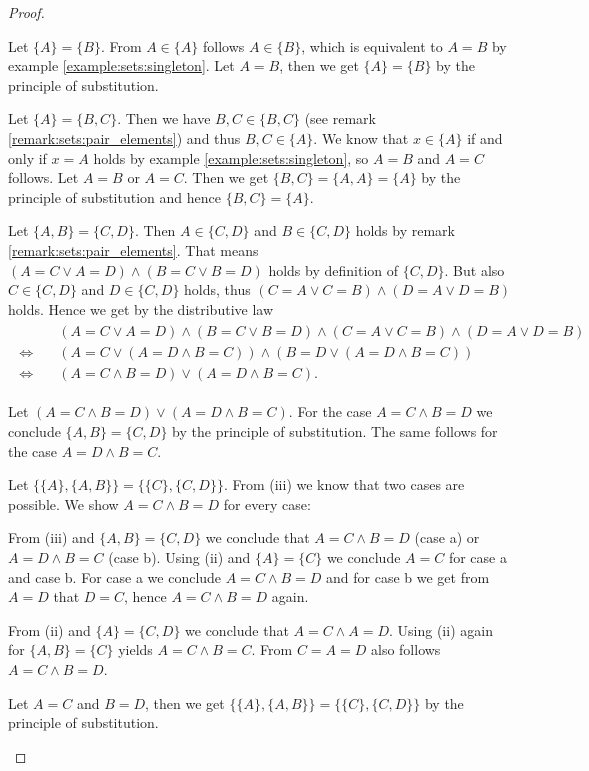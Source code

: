 \begin{proof}
    \begin{proofenumerate}
        \item{} \proofright Let $\{A\}=\{B\}$. From $A\in\{A\}$ follows $A\in\{B\}$, which is equivalent to $A=B$ by example \ref{example:sets:singleton}. \proofleft Let $A=B$, then we get $\{A\}=\{B\}$ by the principle of substitution.
        \item \proofright Let $\{A\}=\{B,C\}$. Then we have $B,C\in\{B,C\}$ (see remark \ref{remark:sets:pair_elements}) and thus $B,C\in\{A\}$. We know that $x\in\{A\}$ if and only if $x=A$ holds by example \ref{example:sets:singleton}, so $A=B$ and $A=C$ follows.
        \proofleft Let $A=B$ or $A=C$. Then we get $\{B,C\}=\{A,A\}=\{A\}$ by the principle of substitution and hence $\{B,C\}=\{A\}$.
        \item \proofright Let $\{A,B\}=\{C,D\}$. Then $A\in\{C,D\}$ and $B\in\{C,D\}$ holds by remark \ref{remark:sets:pair_elements}. That means $(A=C\lor A=D)\land (B=C \lor B=D)$ holds by definition of $\{C,D\}$. But also $C\in\{C,D\}$ and $D\in\{C,D\}$ holds, thus $(C=A\lor C=B)\land(D=A\lor D=B)$ holds. Hence we get by the distributive law
        \begin{align*}\begin{split}&(A=C\lor A=D)\land (B=C\lor B=D)\land (C=A\lor C=B)\land (D=A\lor D=B)\\
        \Leftrightarrow\quad&(A=C\lor(A=D\land B=C))\land (B=D\lor(A=D\land B=C))\\
        \Leftrightarrow\quad& (A=C\land B=D)\lor(A=D\land B=C).\end{split}\end{align*}

        \proofleft Let $(A=C\land B=D)\lor(A=D\land B=C)$. For the case $A=C\land B=D$ we conclude $\{A,B\}=\{C,D\}$ by the principle of substitution. The same follows for the case $A=D\land B=C$.

        \item \proofright Let $\{\{A\},\{A,B\}\}=\{\{C\},\{C,D\}\}$. From (iii) we know that two cases are possible. We show $A=C\land B=D$ for every case:
        
         From (iii) and $\{A,B\}=\{C,D\}$ we conclude that $A=C\land B=D$ (case a) or $A=D\land B=C$ (case b). Using (ii) and $\{A\}=\{C\}$ we conclude $A=C$ for case a and case b. For case a we conclude $A=C\land B=D$ and for case b we get from $A=D$ that $D=C$, hence $A=C\land B=D$ again.

         From (ii) and $\{A\}=\{C,D\}$ we conclude that $A=C\land A=D$. Using (ii) again for $\{A,B\}=\{C\}$ yields $A=C\land B=C$. From $C=A=D$ also follows $A=C\land B=D$.

        \proofleft Let $A=C$ and $B=D$, then we get $\{\{A\},\{A,B\}\}=\{\{C\},\{C,D\}\}$ by the principle of substitution.
    \end{proofenumerate}
\end{proof}

